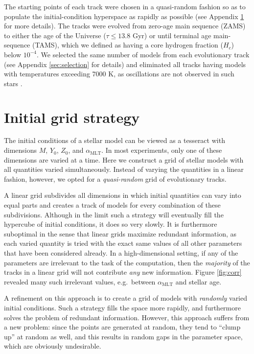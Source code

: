 \documentclass[a4paper,fleqn,usenatbib,useAMS]{mnras}
\begin{document}
The starting points of each track were chosen in a quasi-random fashion so as to populate the initial-condition hyperspace as rapidly as possible (see Appendix \ref{sec:grid} for more details). The tracks were evolved from zero-age main sequence (ZAMS) to either the age of the Universe ($\tau \leq 13.8$ Gyr) or until terminal age main-sequence (TAMS), which we defined as having a core hydrogen fraction ($H_c$) below $10^{-4}$. We selected the same number of models from each evolutionary track (see Appendix \ref{sec:selection} for details) and eliminated all tracks having models with temperatures exceeding 7000 K, as oscillations are not observed in such stars . 

\section{Initial grid strategy}
\label{sec:grid}
The initial conditions of a stellar model can be viewed as a tesseract with dimensions $M$, $Y_0$, $Z_0$, and $\alpha_{\text{MLT}}$. In most experiments, only one of these dimensions are varied at a time. Here we construct a grid of stellar models with all quantities varied simultaneously. Instead of varying the quantities in a linear fashion, however, we opted for a \emph{quasi-random} grid of evolutionary tracks. 

A linear grid subdivides all dimensions in which initial quantities can vary into equal parts and creates a track of models for every combination of these subdivisions. Although in the limit such a strategy will eventually fill the hypercube of initial conditions, it does so very slowly. It is furthermore suboptimal in the sense that linear grids maximize redundant information, as each varied quantity is tried with the exact same values of all other parameters that have been considered already. In a high-dimensional setting, if any of the parameters are irrelevant to the task of the computation, then the \emph{majority} of the tracks in a linear grid will not contribute \emph{any} new information. Figure \ref{fig:corr} revealed many such irrelevant values, e.g.~between $\alpha_{\text{MLT}}$ and stellar age. 

A refinement on this approach is to create a grid of models with \emph{randomly} varied initial conditions. Such a strategy fills the space more rapidly, and furthermore solves the problem of redundant information. However, this approach suffers from a new problem: since the points are generated at random, they tend to ``clump up'' at random as well, and this results in random gaps in the parameter space, which are obviously undesirable. %
\end{document}
